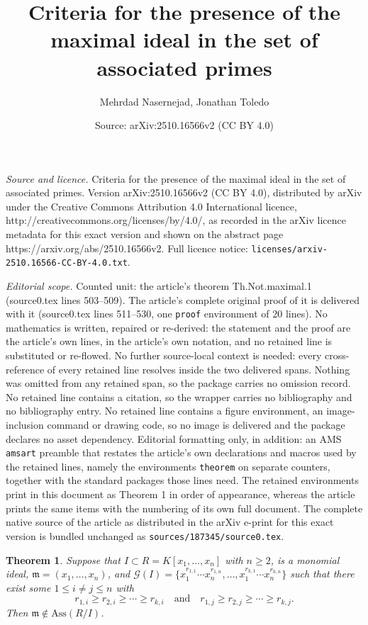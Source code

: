 \documentclass[10pt,a4paper]{amsart}
\title{Criteria for the presence of the maximal ideal in the set of associated primes}
\author{Mehrdad Nasernejad, Jonathan Toledo}
\date{Source: arXiv:2510.16566v2 (CC BY 4.0)}
\newtheorem{theorem}{Theorem}
\begin{document}
\maketitle

\noindent\emph{Source and licence.} Criteria for the presence of the maximal ideal in the set of associated primes. Version arXiv:2510.16566v2 (CC BY 4.0), distributed by arXiv under the Creative Commons Attribution 4.0 International licence, http://creativecommons.org/licenses/by/4.0/, as recorded in the arXiv licence metadata for this exact version and shown on the abstract page https://arxiv.org/abs/2510.16566v2. Full licence notice: \texttt{licenses/arxiv-2510.16566-CC-BY-4.0.txt}.\par\smallskip

\noindent\textit{Editorial scope.} Counted unit: the article's theorem Th.Not.maximal.1 (source0.tex lines 503--509). The article's complete original proof of it is delivered with it (source0.tex lines 511--530, one \texttt{proof} environment of 20 lines). No mathematics is written, repaired or re-derived: the statement and the proof are the article's own lines, in the article's own notation, and no retained line is substituted or re-flowed.  No further source-local context is needed: every cross-reference of every retained line resolves inside the two delivered spans.  Nothing was omitted from any retained span, so the package carries no omission record.  No retained line contains a citation, so the wrapper carries no bibliography and no bibliography entry.  No retained line contains a figure environment, an image-inclusion command or drawing code, so no image is delivered and the package declares no asset dependency.  Editorial formatting only, in addition: an AMS \texttt{amsart} preamble that restates the article's own declarations and macros used by the retained lines, namely the environments \texttt{theorem} on separate counters, together with the standard packages those lines need.  The retained environments print in this document as Theorem 1 in order of appearance, whereas the article prints the same items with the numbering of its own full document.  The complete native source of the article as distributed in the arXiv e-print for this exact version is bundled unchanged as \texttt{sources/187345/source0.tex}.
\begin{theorem} \label{Th.Not.maximal.1}
Suppose that    $I \subset R=K[x_1, \ldots, x_n]$ with $n\geq 2$,   is   a monomial ideal, $\mathfrak{m}=(x_1, \ldots, x_n)$, and 
  $\mathcal{G}(I)=\{x^{r_{1,1}}_1\cdots x^{r_{1,n}}_n, \ldots, x^{r_{k,1}}_1\cdots x^{r_{k,n}}_n\}$
  such that  there exist some  $1\leq i\neq j \leq n$ with 
  $$r_{1,i} \geq r_{2,i} \geq \cdots \geq r_{k, i} \quad \text{and} \quad r_{1,j} \geq r_{2,j} \geq \cdots \geq r_{k, j}.$$ 
   Then   $\mathfrak{m}\notin \mathrm{Ass}(R/I)$. 
\end{theorem}
\end{document}
